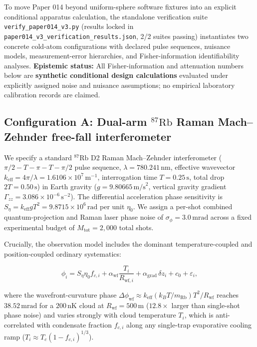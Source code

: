 \documentclass[
  american,
  11pt,
  letterpaper,
]{article}
\begin{document}
To move Paper 014 beyond uniform-sphere software fixtures into an explicit conditional apparatus calculation, the standalone verification suite \nolinkurl{verify_paper014_v3.py} (results locked in \nolinkurl{paper014_v3_verification_results.json}, 2/2 suites passing) instantiates two concrete cold-atom configurations with declared pulse sequences, nuisance models, measurement-error hierarchies, and Fisher-information identifiability analyses. \textbf{Epistemic status:} All Fisher-information and attenuation numbers below are \textbf{synthetic conditional design calculations} evaluated under explicitly assigned noise and nuisance assumptions; no empirical laboratory calibration records are claimed.

\subsection{\texorpdfstring{Configuration A: Dual-arm \(^{87}\mathrm{Rb}\) Raman Mach--Zehnder free-fall interferometer}{Configuration A: Dual-arm \^{}\{87\}\textbackslash mathrm\{Rb\} Raman Mach--Zehnder free-fall interferometer}}\label{configuration-a-dual-arm-87mathrmrb-raman-machzehnder-free-fall-interferometer}

We specify a standard \(^{87}\mathrm{Rb}\) D2 Raman Mach--Zehnder interferometer (\(\pi/2 - T - \pi - T - \pi/2\) pulse sequence, \(\lambda = 780.241\,\mathrm{nm}\), effective wavevector \(k_{\mathrm{eff}} = 4\pi/\lambda = 1.6106 \times 10^7\,\mathrm{m}^{-1}\), interrogation time \(T = 0.25\,\mathrm{s}\), total drop \(2T = 0.50\,\mathrm{s}\)) in Earth gravity (\(g = 9.80665\,\mathrm{m/s}^2\), vertical gravity gradient \(\Gamma_{zz} = 3.086 \times 10^{-6}\,\mathrm{s}^{-2}\)). The differential acceleration phase sensitivity is \(S_\eta = k_{\mathrm{eff}} g T^2 = 9.8715 \times 10^6\,\mathrm{rad}\) per unit \(\eta_0\). We assign a per-shot combined quantum-projection and Raman laser phase noise of \(\sigma_\phi = 3.0\,\mathrm{mrad}\) across a fixed experimental budget of \(M_{\mathrm{tot}} = 2{,}000\) total shots.

Crucially, the observation model includes the dominant temperature-coupled and position-coupled ordinary systematics:

\begin{equation}
\phi_i = S_\eta \eta_0 f_{c,i}
+ \alpha_{\mathrm{wf}} \frac{T_i}{R_{\mathrm{wf},i}}
+ \alpha_{\mathrm{grad}}\,\delta z_i
+ c_0
+ \varepsilon_i,
\end{equation}

where the wavefront-curvature phase \(\Delta\phi_{\mathrm{wf}} \approx k_{\mathrm{eff}} (k_B T / m_{\mathrm{Rb}}) T^2 / R_{\mathrm{wf}}\) reaches \textbf{\(38.52\,\mathrm{mrad}\)} for a \(200\,\mathrm{nK}\) cloud at \(R_{\mathrm{wf}} = 500\,\mathrm{m}\) (\(12.8\times\) larger than single-shot phase noise) and varies strongly with cloud temperature \(T_i\), which is anti-correlated with condensate fraction \(f_{c,i}\) along any single-trap evaporative cooling ramp (\(T_i \approx T_c(1 - f_{c,i})^{1/3}\)).
\end{document}
